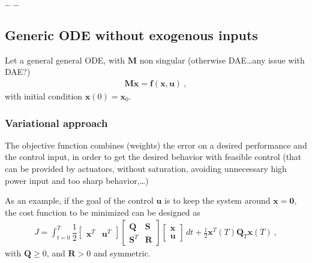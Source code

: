 \documentclass[letterpaper,10pt,english]{jupyterBook}
\begin{document}
\sphinxAtStartPar
…
…

\sphinxstepscope


\subsection{Generic ODE without exogenous inputs}
\label{\detokenize{ch/control/optimal-control-full-state-general-ode:generic-ode-without-exogenous-inputs}}\label{\detokenize{ch/control/optimal-control-full-state-general-ode:control-optimal-full-state-fb-ode}}\label{\detokenize{ch/control/optimal-control-full-state-general-ode::doc}}
\sphinxAtStartPar
Let a general general ODE, with \(\mathbf{M}\) non singular (otherwise DAE…any issue with DAE?)
\begin{equation*}
\begin{split}\mathbf{M} \dot{\mathbf{x}} = \mathbf{f}(\mathbf{x}, \mathbf{u}) \ ,\end{split}
\end{equation*}
\sphinxAtStartPar
with initial condition \(\mathbf{x}(0) = \mathbf{x}_0\).


\subsubsection{Variational approach}
\label{\detokenize{ch/control/optimal-control-full-state-general-ode:variational-approach}}\label{\detokenize{ch/control/optimal-control-full-state-general-ode:control-optimal-full-state-fb-ode-variational-approach}}
\sphinxAtStartPar
The objective function combines (weights) the error on a desired performance and the control input, in order to get the desired behavior with feasible control (that can be provided by actuators, without saturation, avoiding unnecessary high power input and too sharp behavior,…)

\sphinxAtStartPar
As an example, if the goal of the control \(\mathbf{u}\) is to keep the system around \(\mathbf{x} = \mathbf{0}\), the cost function to be minimized can be designed as
\begin{equation*}
\begin{split}J = \int_{t=0}^{T} \dfrac{1}{2} \begin{bmatrix} \mathbf{x}^T & \mathbf{u}^T \end{bmatrix} \begin{bmatrix}  \mathbf{Q} & \mathbf{S} \\ \mathbf{S}^T & \mathbf{R} \end{bmatrix} \begin{bmatrix} \mathbf{x} \\ \mathbf{u} \end{bmatrix} \, dt + \frac{1}{2} \mathbf{x}^T(T) \mathbf{Q}_T \mathbf{x}(T) \ ,\end{split}
\end{equation*}
\sphinxAtStartPar
with \(\mathbf{Q} \ge 0\), and \(\mathbf{R} > 0\) and symmetric.
\end{document}

